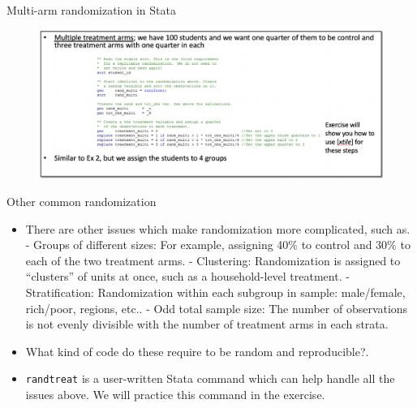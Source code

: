 \documentclass[aspectratio=169]{beamer}
\begin{document}
\begin{frame}{Multi-arm randomization in Stata}

\begin{figure}
	\centering
	\includegraphics[width=\linewidth]{img/Randomization11}
\end{figure}

\end{frame}


\begin{frame}{Other common randomization}
\begin{multicols}{2}	
	
	\begin{itemize}[<default overlay specification>]
		\item<1>  There are other issues which make randomization more complicated, such as.
			\newline - Groups of different sizes: For example, assigning 40\% to control and 30\% to each of the two treatment arms.
			\newline - Clustering: Randomization is assigned to “clusters” of units at once, such as a household-level treatment.
			\newline - Stratification: Randomization within each subgroup in sample: male/female, rich/poor, regions, etc..
			\newline - Odd total sample size: The number of observations is not evenly divisible with the number of treatment arms in each strata. 
		\item<1>  What kind of code do these require to be random and reproducible?.
		\item<1>  \texttt{randtreat} is a user-written Stata command which can help handle all the issues above. We will practice this command in the exercise.
	\end{itemize}
	
\end{multicols}
\end{frame}
\end{document}

